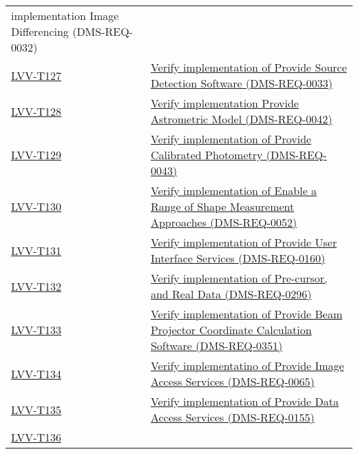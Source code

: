 \begin{longtable}[]{@{}ll@{}}
{implementation Image Differencing (DMS-REQ-0032)}\tabularnewline
\protect\hyperlink{lvv-t127---verify-implementation-of-provide-source-detection-software-dms-req-0033}{LVV-T127}
&
\href{https://jira.lsstcorp.org/secure/Tests.jspa\#/testCase/LVV-T127}{Verify
implementation of Provide Source Detection Software
(DMS-REQ-0033)}\tabularnewline
\protect\hyperlink{lvv-t128---verify-implementation-provide-astrometric-model-dms-req-0042}{LVV-T128}
&
\href{https://jira.lsstcorp.org/secure/Tests.jspa\#/testCase/LVV-T128}{Verify
implementation Provide Astrometric Model (DMS-REQ-0042)}\tabularnewline
\protect\hyperlink{lvv-t129---verify-implementation-of-provide-calibrated-photometry-dms-req-0043}{LVV-T129}
&
\href{https://jira.lsstcorp.org/secure/Tests.jspa\#/testCase/LVV-T129}{Verify
implementation of Provide Calibrated Photometry
(DMS-REQ-0043)}\tabularnewline
\protect\hyperlink{lvv-t130---verify-implementation-of-enable-a-range-of-shape-measurement-approaches-dms-req-0052}{LVV-T130}
&
\href{https://jira.lsstcorp.org/secure/Tests.jspa\#/testCase/LVV-T130}{Verify
implementation of Enable a Range of Shape Measurement Approaches
(DMS-REQ-0052)}\tabularnewline
\protect\hyperlink{lvv-t131---verify-implementation-of-provide-user-interface-services--dms-req-0160}{LVV-T131}
&
\href{https://jira.lsstcorp.org/secure/Tests.jspa\#/testCase/LVV-T131}{Verify
implementation of Provide User Interface Services
(DMS-REQ-0160)}\tabularnewline
\protect\hyperlink{lvv-t132---verify-implementation-of-pre-cursor-and-real-data-dms-req-0296}{LVV-T132}
&
\href{https://jira.lsstcorp.org/secure/Tests.jspa\#/testCase/LVV-T132}{Verify
implementation of Pre-cursor, and Real Data
(DMS-REQ-0296)}\tabularnewline
\protect\hyperlink{lvv-t133---verify-implementation-of-provide-beam-projector-coordinate-calculation-software-dms-req-0351}{LVV-T133}
&
\href{https://jira.lsstcorp.org/secure/Tests.jspa\#/testCase/LVV-T133}{Verify
implementation of Provide Beam Projector Coordinate Calculation Software
(DMS-REQ-0351)}\tabularnewline
\protect\hyperlink{lvv-t134---verify-implementatino-of-provide-image-access-services-dms-req-0065}{LVV-T134}
&
\href{https://jira.lsstcorp.org/secure/Tests.jspa\#/testCase/LVV-T134}{Verify
implementatino of Provide Image Access Services
(DMS-REQ-0065)}\tabularnewline
\protect\hyperlink{lvv-t135---verify-implementation-of-provide-data-access-services-dms-req-0155}{LVV-T135}
&
\href{https://jira.lsstcorp.org/secure/Tests.jspa\#/testCase/LVV-T135}{Verify
implementation of Provide Data Access Services
(DMS-REQ-0155)}\tabularnewline
\protect\hyperlink{lvv-t136---verify-implementation-of-data-product-and-raw-data-access-dms-req-0298}{LVV-T136}

\end{longtable}

